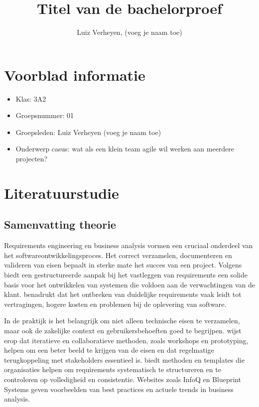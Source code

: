 \documentclass[dutch,dit,thesis]{hogentreport}
\author{Luiz Verheyen, (voeg je naam toe)}
\title[Optionele ondertitel]{Titel van de bachelorproef}
\begin{document}
\frontmatter
\maketitle

\tableofcontents

\mainmatter{}

\chapter*{Voorblad informatie}
\begin{itemize}
    \item Klas: 3A2
    \item Groepsnummer: 01
    \item Groepsleden: Luiz Verheyen (voeg je naam toe)
    \item Onderwerp casus: wat als een klein team agile wil werken aan meerdere projecten?
\end{itemize}

\chapter{Literatuurstudie}

\section*{Samenvatting theorie}

Requirements engineering en business analysis vormen een cruciaal onderdeel van het softwareontwikkelingsproces. Het correct verzamelen, documenteren en valideren van eisen bepaalt in sterke mate het succes van een project. Volgens \parencite{robertson2012} biedt een gestructureerde aanpak bij het vastleggen van requirements een solide basis voor het ontwikkelen van systemen die voldoen aan de verwachtingen van de klant. \parencite{sommerville2016} benadrukt dat het ontbreken van duidelijke requirements vaak leidt tot vertragingen, hogere kosten en problemen bij de oplevering van software.

In de praktijk is het belangrijk om niet alleen technische eisen te verzamelen, maar ook de zakelijke context en gebruikersbehoeften goed te begrijpen. \parencite{ireb2025} wijst erop dat iteratieve en collaboratieve methoden, zoals workshops en prototyping, helpen om een beter beeld te krijgen van de eisen en dat regelmatige terugkoppeling met stakeholders essentieel is. \parencite{volere2025} biedt methoden en templates die organisaties helpen om requirements systematisch te structureren en te controleren op volledigheid en consistentie. Websites zoals InfoQ \parencite{infoq2025} en Blueprint Systems \parencite{blueprint2025} geven voorbeelden van best practices en actuele trends in business analysis.
\end{document}
